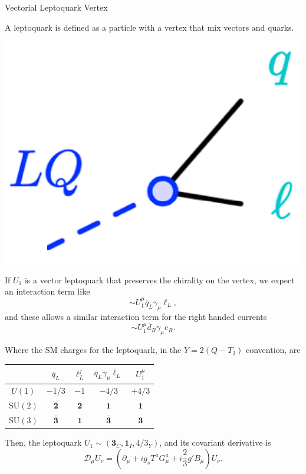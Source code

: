 \documentclass{bredelebeamer}
\begin{document}
\begin{frame}{Vectorial Leptoquark Vertex}
	\begin{multicols}{2}
	A leptoquark is defined as a particle with a vertex that mix vectors and quarks.
	\begin{center}
	\includegraphics[width=.25\textwidth]{LQ_vertex.png}
	\end{center}
	If $U_1$ is a vector leptoquark that preserves the chirality on the vertex, we expect an interaction term like
	$$
	\sim U_1^\mu\bar{q}_{L} \gamma_{\mu} \ell_{L},
	$$
	and these allows a similar interaction term for the right handed currents 
	$$
	\sim U_1^\mu\bar{d}_{R} \gamma_{\mu} e_{R}.
	$$

	\end{multicols}
	Where the SM charges for the leptoquark, in the $Y=2(Q-T_3)$ convention, are
	\begin{center}
		\begin{tabular}{|c|c|c|c|c|}
			\hline & $\bar{q}_{L}$ & $\ell_{L}^{j}$ & $\bar{q}_{L}\gamma_{\mu} \ell_{L}$ & $U_{1}^{\mu}$ \\
			\hline$U(1)$ & $-1 / 3$ & $-1 $ & $-4 / 3$ & $+4 / 3$ \\
			\hline $\mathrm{SU}(2)$ & $\overline{\mathbf 2}$ & $\mathbf{2}$ & $\mathbf{1}$ & $\mathbf{1}$ \\
			\hline $\mathrm{SU}(3)$ & $\overline{\mathbf 3}$ & $\mathbf{1}$ & $\overline{\mathbf3}$ & $\mathbf{3}$ \\
			\hline
		\end{tabular}	
	\end{center}
	Then, the leptoquark $U_1 \sim \left(\mathbf{3}_{C}, \mathbf{1}_{I}, 4 / 3_{Y}\right)$, and its covariant derivative is
	$$
	\mathcal{D}_\mu U_\nu = \left(\partial_\mu+i g_s T^a G_\mu^a+ i \frac{2}{3} g' B_\mu \right)U_\nu.
	$$
\end{frame}
\end{document}
